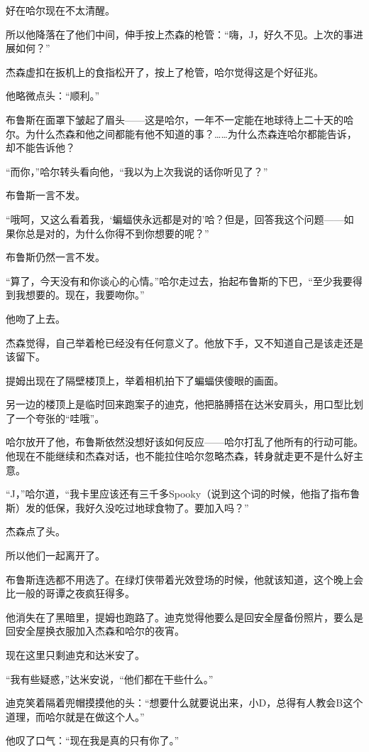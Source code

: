 \documentclass[../main.tex]{subfiles}
\begin{document}
好在哈尔现在不太清醒。

所以他降落在了他们中间，伸手按上杰森的枪管：“嗨，J，好久不见。上次的事进展如何？”

杰森虚扣在扳机上的食指松开了，按上了枪管，哈尔觉得这是个好征兆。

他略微点头：“顺利。”

布鲁斯在面罩下皱起了眉头——这是哈尔，一年不一定能在地球待上二十天的哈尔。为什么杰森和他之间都能有他不知道的事？……为什么杰森连哈尔都能告诉，却不能告诉他？

“而你，”哈尔转头看向他，“我以为上次我说的话你听见了？”

布鲁斯一言不发。

“哦呵，又这么看着我，`蝙蝠侠永远都是对的'哈？但是，回答我这个问题——如果你总是对的，为什么你得不到你想要的呢？”

布鲁斯仍然一言不发。

“算了，今天没有和你谈心的心情。”哈尔走过去，抬起布鲁斯的下巴，“至少我要得到我想要的。现在，我要吻你。”

他吻了上去。

杰森觉得，自己举着枪已经没有任何意义了。他放下手，又不知道自己是该走还是该留下。

提姆出现在了隔壁楼顶上，举着相机拍下了蝙蝠侠傻眼的画面。

另一边的楼顶上是临时回来跑案子的迪克，他把胳膊搭在达米安肩头，用口型比划了一个夸张的“哇哦”。

哈尔放开了他，布鲁斯依然没想好该如何反应——哈尔打乱了他所有的行动可能。他现在不能继续和杰森对话，也不能拉住哈尔忽略杰森，转身就走更不是什么好主意。

“J，”哈尔道，“我卡里应该还有三千多Spooky（说到这个词的时候，他指了指布鲁斯）发的低保，我好久没吃过地球食物了。要加入吗？”

杰森点了头。

所以他们一起离开了。

布鲁斯连选都不用选了。在绿灯侠带着光效登场的时候，他就该知道，这个晚上会比一般的哥谭之夜疯狂得多。

他消失在了黑暗里，提姆也跑路了。迪克觉得他要么是回安全屋备份照片，要么是回安全屋换衣服加入杰森和哈尔的夜宵。

现在这里只剩迪克和达米安了。

“我有些疑惑，”达米安说，“他们都在干些什么。”

迪克笑着隔着兜帽摸摸他的头：“想要什么就要说出来，小D，总得有人教会B这个道理，而哈尔就是在做这个人。”

他叹了口气：“现在我是真的只有你了。”
\end{document}
